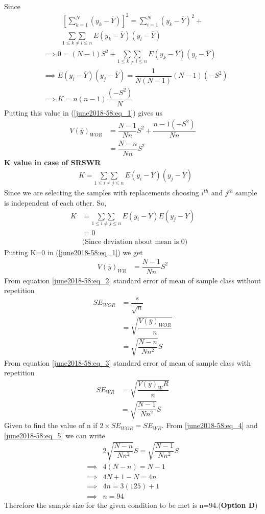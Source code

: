 Since
\begin{multline*}
\left[\sum_{k=1}^N(y_k-\overline{Y})\right]^2=\sum_{i=1}^{N}(y_k-\overline{Y})^2+\\
\underset{1\leq k\neq l\leq n}{\sum\sum}\, E(y_k-\overline{Y})(y_l-\overline{Y})
\end{multline*}
\begin{align*}
&\implies 0 = (N-1)S^2+\underset{1\leq k\neq l\leq n}{\sum\sum}\, E(y_k-\overline{Y})(y_l-\overline{Y})\\
& \implies E(y_i-\overline{Y})(y_j-\overline{Y})=\dfrac{1}{N(N-1)}(N-1)(-S^2)\\
& \implies K = n(n-1)\dfrac{(-S^2)}{N}
\end{align*}
Putting this value in (\ref{june2018-58:eq_1}) gives us 
\begin{align}
V(\overline{y})_{WOR} & = \dfrac{N-1}{Nn} S^2+ \dfrac{n-1(-S^2)}{Nn}\\
& = \dfrac{N-n}{Nn} S^2 \label{june2018-58:eq_2}
\end{align}
\textbf{K value in case of SRSWR}
\begin{align*}
&K=\underset{1\leq i\neq j\leq n}{\sum\sum}\, E(y_i-\overline{Y})(y_j-\overline{Y})
\end{align*}
Since we are selecting the samples with replacements choosing $i^{th}$ and $j^{th}$ sample is independent of each other. So,
\begin{align*}
K&=\underset{1\leq i\neq j\leq n}{\sum\sum}\, E(y_i-\overline{Y})E(y_j-\overline{Y})\\
& = 0\\
& \text{(Since deviation about mean is 0)}
\end{align*}
Putting K=0 in (\ref{june2018-58:eq_1}) we get 
\begin{align}
V(\overline{y})_{WR} & = \dfrac{N-1}{Nn} S^2\label{june2018-58:eq_3}
\end{align}
From equation \eqref{june2018-58:eq_2}  standard error of mean of sample class without repetition
\begin{align}
{SE}_{WOR} & = \dfrac{s}{\sqrt{n}}\\
& = \sqrt{\dfrac{V(\overline{y})_{WOR}}{n}}\\
& = \sqrt{\dfrac{N-n}{Nn^2}}S \label{june2018-58:eq_4}
\end{align} 
From equation \eqref{june2018-58:eq_3}  standard error of mean of sample class with repetition
\begin{align}
{SE}_{WR} & = \sqrt{\dfrac{V(\overline{y})_WR}{n}}\\
& = \sqrt{\dfrac{N-1}{Nn^2}}S \label{june2018-58:eq_5}
\end{align}
Given to find the value of n if $2 \times {SE}_{WOR} =  {SE}_{WR}$.
From \eqref{june2018-58:eq_4} and \eqref{june2018-58:eq_5} we can write 
\begin{align}
& 2\sqrt{\dfrac{N-n}{Nn^2}}S= \sqrt{\dfrac{N-1}{Nn^2}}S\\
\implies & 4(N-n) = N-1\\
\implies & 4N+1-N=4n\\
\implies & 4n=3(125)+1\\
\implies & n=94
\end{align}
Therefore the sample size for the given condition to be met is n=94.(\textbf{Option D})
